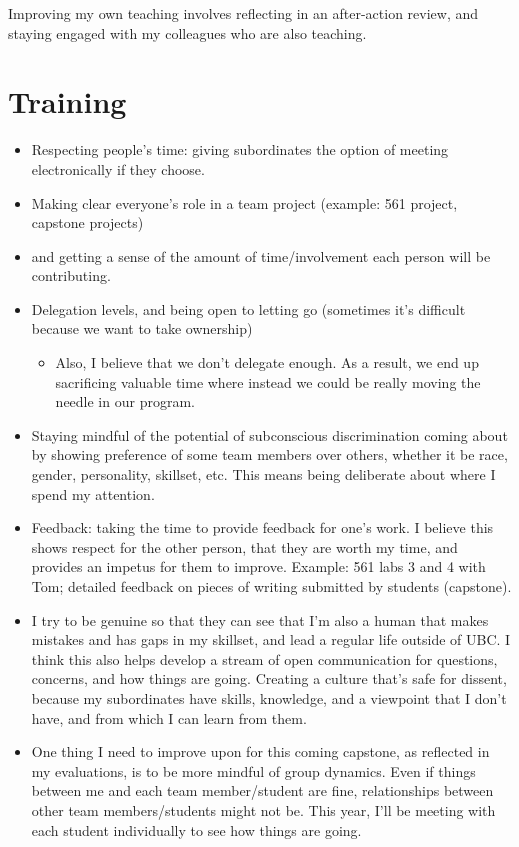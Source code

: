\documentclass[]{book}
\providecommand{\tightlist}{%
  \setlength{\itemsep}{0pt}\setlength{\parskip}{0pt}}
\begin{document}
Improving my own teaching involves reflecting in an after-action review, and staying engaged with my colleagues who are also teaching.

\hypertarget{training}{%
\section{Training}\label{training}}

\begin{itemize}
\tightlist
\item
  Respecting people's time: giving subordinates the option of meeting electronically if they choose.
\item
  Making clear everyone's role in a team project (example: 561 project, capstone projects)
\item
  and getting a sense of the amount of time/involvement each person will be contributing.
\item
  Delegation levels, and being open to letting go (sometimes it's difficult because we want to take ownership)

  \begin{itemize}
  \tightlist
  \item
    Also, I believe that we don't delegate enough. As a result, we end up sacrificing valuable time where instead we could be really moving the needle in our program.
  \end{itemize}
\item
  Staying mindful of the potential of subconscious discrimination coming about by showing preference of some team members over others, whether it be race, gender, personality, skillset, etc. This means being deliberate about where I spend my attention.
\item
  Feedback: taking the time to provide feedback for one's work. I believe this shows respect for the other person, that they are worth my time, and provides an impetus for them to improve. Example: 561 labs 3 and 4 with Tom; detailed feedback on pieces of writing submitted by students (capstone).
\item
  I try to be genuine so that they can see that I'm also a human that makes mistakes and has gaps in my skillset, and lead a regular life outside of UBC. I think this also helps develop a stream of open communication for questions, concerns, and how things are going. Creating a culture that's safe for dissent, because my subordinates have skills, knowledge, and a viewpoint that I don't have, and from which I can learn from them.
\item
  One thing I need to improve upon for this coming capstone, as reflected in my evaluations, is to be more mindful of group dynamics. Even if things between me and each team member/student are fine, relationships between other team members/students might not be. This year, I'll be meeting with each student individually to see how things are going.
\end{itemize}
\end{document}
